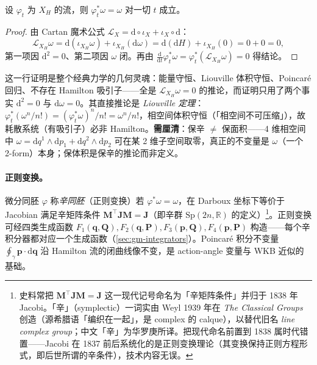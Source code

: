 \begin{theorem}\label{thm:gm-flow-symplectic}
设 $\varphi_t$ 为 $X_H$ 的流，则 $\varphi_t^*\omega=\omega$ 对一切 $t$ 成立。
\end{theorem}

\begin{proof}
由 Cartan 魔术公式 $\mathcal L_X=\mathrm d\circ\iota_X+\iota_X\circ\mathrm d$：
\[
\mathcal L_{X_H}\omega=\mathrm d(\iota_{X_H}\omega)+\iota_{X_H}(\mathrm d\omega)=\mathrm d(\mathrm dH)+\iota_{X_H}(0)=0+0=0,
\]
第一项因 $\mathrm d^2=0$、第二项因 $\omega$ 闭。再由 $\tfrac{\mathrm d}{\mathrm dt}\varphi_t^*\omega=\varphi_t^*(\mathcal L_{X_H}\omega)=0$ 得结论。
\end{proof}

\begin{insight}
这一行证明是整个经典力学的几何灵魂：能量守恒、Liouville 体积守恒、Poincaré 回归、不存在 Hamilton 吸引子——全是 $\mathcal L_{X_H}\omega=0$ 的推论，而证明只用了两个事实 $\mathrm d^2=0$ 与 $\mathrm d\omega=0$。其直接推论是 \emph{Liouville 定理}：$\varphi_t^*(\omega^n/n!)=(\varphi_t^*\omega)^n/n!=\omega^n/n!$，相空间体积守恒（「相空间不可压缩」），故耗散系统（有吸引子）必非 Hamilton。\textbf{需厘清}：保辛 $\ne$ 保面积——4 维相空间中 $\omega=\mathrm dq^1\wedge\mathrm dp_1+\mathrm dq^2\wedge\mathrm dp_2$ 可在某 2 维子空间取零，真正的不变量是 $\omega$（一个 2-form）本身；保体积是保辛的推论而非定义。
\end{insight}

\paragraph{正则变换。}
微分同胚 $\varphi$ 称\emph{辛同胚}（正则变换）若 $\varphi^*\omega=\omega$，在 Darboux 坐标下等价于 Jacobian 满足辛矩阵条件 $\mathbf M^\top\mathbf J\mathbf M=\mathbf J$（即辛群 $\mathrm{Sp}(2n,\mathbb R)$ 的定义）\footnote{史料常把 $\mathbf M^\top\mathbf J\mathbf M=\mathbf J$ 这一现代记号命名为「辛矩阵条件」并归于 1838 年 Jacobi。「辛」（symplectic）一词实由 Weyl 1939 年在 \emph{The Classical Groups} 创造（源希腊语「编织在一起」，是 complex 的 calque），以替代旧名 \emph{line complex group}；中文「辛」为华罗庚所译。把现代命名前置到 1838 属时代错置——Jacobi 在 1837 前后系统化的是正则变换理论（其变换保持正则方程形式，即后世所谓的辛条件），技术内容无误。}。正则变换可经四类生成函数 $F_1(\mathbf q,\mathbf Q),F_2(\mathbf q,\mathbf P),F_3(\mathbf p,\mathbf Q),F_4(\mathbf p,\mathbf P)$ 构造——每个辛积分器都对应一个生成函数（\cref{sec:gm-integrators}）。Poincaré 积分不变量 $\oint_\gamma\mathbf p\cdot\mathrm d\mathbf q$ 沿 Hamilton 流的闭曲线像不变，是 action-angle 变量与 WKB 近似的基础。

